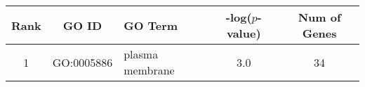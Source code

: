 \centering \begin{tabular}{c|c|p{4in}|c|c}
Rank	&GO ID	&GO Term	&-log($p$-value)	&Num of Genes\\\hline
1	&GO:0005886	&plasma membrane	&3.0	&34\\
\end{tabular}
